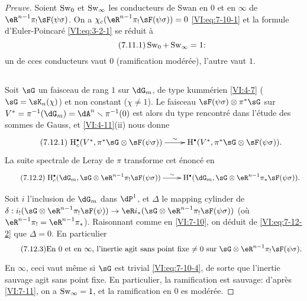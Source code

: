 \begin{proof}[Preuve]
Soient $\operatorname{Sw}_0$ et $\operatorname{Sw}_\infty$ les conducteurs de Swan en $0$ et en 
$\infty$ de $\eR^{n-1} \pi_! \sF(\psi\sigma)$. On a 
$\chi_c(\eR^{n-1} \pi_! \sF(\psi\sigma))=0$ \eqref{VI:eq:7-10-1} et la formule 
d'Euler-Poincaré \eqref{VI:eq:3-2-1} se réduit à 
\begin{equation*}\tag{7.11.1}\label{VI:eq:7-11-1}
  \operatorname{Sw}_0 + \operatorname{Sw}_\infty =1 \text{:} 
\end{equation*}
un de cces conducteurs vaut $0$ (ramification modérée), l'autre vaut $1$. 





\subsection{}\label{VI:7-12}

Soit $\sG$ un faisceau de rang $1$ sur $\dG_m$, de type kummérien 
\ref{VI:4-7} ($\sG=\sK_n(\chi)$) et non constant ($\chi\ne 1$). Le faisceau 
$\sF(\psi\sigma)\otimes \pi^\ast \sG$ sur 
$V^\ast=\pi^{-1}(\dG_m) = \dA^n\setminus \pi^{-1}(0)$ est alors du type 
rencontré dans l'étude des sommes de Gauss, et \ref{VI:4-11}(ii) nous donne 
\begin{equation*}\tag{7.12.1}\label{VI:eq:7-12-1}
\xymatrix{
  \h_c^\bullet(V^\ast,\pi^\ast\sG\otimes \sF(\psi\sigma)) \ar[r]^-\sim 
    & \h^\bullet(V^\ast,\pi^\ast \sG\otimes \sF(\psi\sigma)) \text{.} 
}
\end{equation*}
La suite spectrale de Leray de $\pi$ transforme cet énoncé en 
\begin{equation*}\tag{7.12.2}\label{VI:eq:7-12-2}
\xymatrix{
  \h_c^\bullet(\dG_m,\sG\otimes \eR^{n-1} \pi_! \sF(\psi\sigma)) \ar[r]^-\sim 
    & \h^\bullet(\dG_m,\sG\otimes \eR^{n-1} \pi_\ast \sF(\psi\sigma)) \text{.} 
}
\end{equation*}

Soit $i$ l'inclusion de $\dG_m$ dans $\dP^1$, et $\Delta$ le mapping cylinder 
de 
$\delta:i_!(\sG\otimes \eR^{n-1}\pi_! \sF(\psi))\to \eR i_\ast (\sG\otimes \eR^{n-1} \pi_! \sF(\psi\sigma))$
(où $\eR^{n-1} \pi_! = \eR^{n-1}\pi_\ast$). Raisonnant comme en 
\ref{VI:7-10}, on déduit de \eqref{VI:eq:7-12-2} que $\Delta=0$. En 
particulier 
\begin{equation*}\tag{7.12.3}\label{VI:eq:7-12-3}
  \text{En $0$ et en $\infty$, l'inertie agit sans point fixe $\ne 0$ sur $\sG\otimes \eR^{n-1}\pi_! \sF(\psi\sigma)$.}
\end{equation*}

En $\infty$, ceci vaut même si $\sG$ est trivial \eqref{VI:eq:7-10-4}, de 
sorte que l'inertie sauvage agit sans point fixe. En particulier, la 
ramification est sauvage: d'après \ref{VI:7-11}, on a $\operatorname{Sw}_\infty=1$, et la 
ramification en $0$ es modérée. 


\end{proof}
